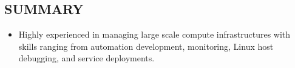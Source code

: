 \documentclass[line,margin]{res}
\begin{document}
\address{Phone: +1.650.772.1711 $|$ Email: alan.huang.250r@gmail.com}

\begin{resume}

\vspace{-10px}
\section{SUMMARY}
\vspace{25px}
\begin{adjustwidth}{-115pt}{0pt}
\begin{itemize}
	\item Highly experienced in managing large scale compute infrastructures with skills ranging from automation development, monitoring, Linux host debugging, and service deployments.
\end{itemize}
\end{adjustwidth}


\end{resume}
\end{document}
